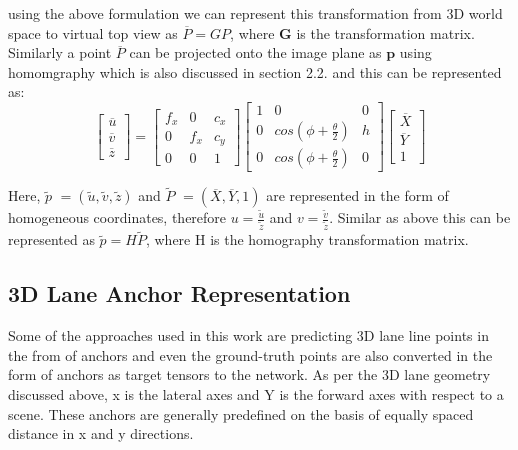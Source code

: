     using the above formulation we can represent this transformation from 3D world space to virtual top view as \textbf{$\overline{P} = GP$}, where \textbf{G} is the transformation matrix. Similarly a point \textbf{$\overline{P}$} can be projected onto the image plane as $\textbf{p}$ using homomgraphy which is also discussed in section 2.2. and this can be represented as: 
    \begin{equation}
       \begin{bmatrix}\overline{u}  \\\overline{v} \\ \overline{z}\end{bmatrix} = \begin{bmatrix} f_{x} & 0& c_{x}  \\0 &f_{x} & c_{y} \\ 0 & 0 & 1     \end{bmatrix}\begin{bmatrix} 1 & 0& 0  \\0 &cos(\phi+ \frac{\theta}{2}) & h \\ 0 &cos(\phi+ \frac{\theta}{2}) & 0     \end{bmatrix}\begin{bmatrix}\overline{X}  \\\overline{Y} \\ 1\end{bmatrix}
    \end{equation}

    Here, \textbf{$\widetilde{p}$} $= (\widetilde{u}, \widetilde{v}, \widetilde{z})$ and  \textbf{$\widetilde{P}$} $= (\overline{X},\overline{Y},1 )$ are represented in the form of homogeneous coordinates, therefore $u = \frac{\widetilde{u}} {\widetilde{z}} $ and $v = \frac{\widetilde{v}} {\widetilde{z}} $. Similar as above this can be represented as \textbf{$\widetilde{p} = H\widetilde{P}$}, where H is the homography transformation matrix. 
    
    \subsection{3D Lane Anchor Representation}
    Some of the approaches used in this work are predicting 3D lane line points in the from of anchors and even the ground-truth points are also converted in the form of anchors as target tensors to the network.  As per the 3D lane geometry discussed above, x is the lateral axes and Y is the forward axes with respect to a scene. These anchors are generally predefined on the basis of equally spaced distance in x and y directions. 
    
